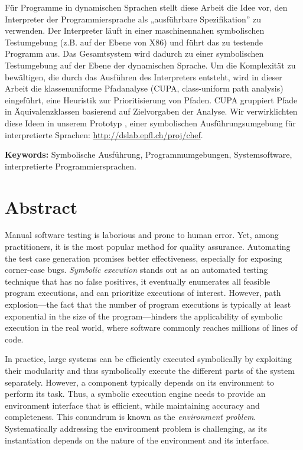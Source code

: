 Für Programme in dynamischen Sprachen stellt diese Arbeit die Idee vor, den Interpreter der Programmiersprache als „ausführbare Spezifikation” zu verwenden. Der Interpreter läuft in einer maschinennahen symbolischen Testumgebung (z.B. auf der Ebene von X86) und führt das zu testende Programm aus. Das Gesamtsystem wird dadurch zu einer symbolischen Testumgebung auf der Ebene der dynamischen Sprache. Um die Komplexität zu bewältigen, die durch das Ausführen des Interpreters entsteht, wird in dieser Arbeit die klassenuniforme Pfadanalyse (CUPA, class-uniform path analysis) eingeführt, eine Heuristik zur Prioritisierung von Pfaden. CUPA gruppiert Pfade in Äquivalenzklassen basierend auf Zielvorgaben der Analyse. Wir verwirklichten diese Ideen in unserem Prototyp \emph{\chef}, einer symbolischen Ausführungsumgebung für interpretierte Sprachen: {\url{http://dslab.epfl.ch/proj/chef}}.

\noindent \textbf{Keywords:} Symbolische Ausführung, Programmumgebungen, Systemsoftware, interpretierte Programmiersprachen.

\chapter*{Abstract}

Manual software testing is laborious and prone to human error.  Yet, among practitioners, it is the most popular method for quality assurance.  Automating the test case generation promises better effectiveness, especially for exposing corner-case bugs.
%
\emph{Symbolic execution} stands out as an automated testing technique that has no false positives, it eventually enumerates all feasible program executions, and can prioritize executions of interest.
%
However, path explosion---the fact that the number of program executions is typically at least exponential in the size of the program---hinders the applicability of symbolic execution in the real world, where software commonly reaches millions of lines of code.

In practice, large systems can be efficiently executed symbolically by exploiting their modularity and thus symbolically execute the different parts of the system separately.
%
However, a component typically depends on its environment to perform its task.  Thus, a symbolic execution engine needs to provide an environment interface that is efficient, while maintaining accuracy and completeness.  This conundrum is known as the \emph{environment problem}.
%
Systematically addressing the environment problem is challenging, as its instantiation depends on the nature of the environment and its interface.

